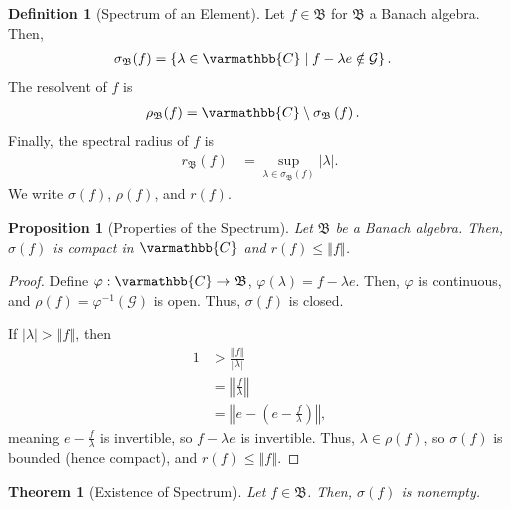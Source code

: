 \documentclass[12pt]{extarticle}
\newcommand{\C}{\mathbb{C}}
\newcommand{\norm}[1]{\left\Vert #1\right\Vert}
\newcommand{\set}[1]{\left\{#1\right\}}
\theoremstyle{plain}
\newtheorem*{theorem}{Theorem}
\newtheorem*{proposition}{Proposition}
\theoremstyle{definition}
\newtheorem*{definition}{Definition}
\theoremstyle{note}
\renewcommand*{\mathbb}[1]{\varmathbb{#1}}
\renewcommand{\newline}{\hfill\break}
\begin{document}
\begin{definition}[Spectrum of an Element]
  Let $f\in \mathfrak{B}$ for $\mathfrak{B}$ a Banach algebra. Then,
  \begin{align*}
    \sigma_{\mathfrak{B}}(f) &= \set{\lambda \in \C\mid f - \lambda e\notin \mathcal{G}}.
  \end{align*}
  The resolvent of $f$ is
  \begin{align*}
    \rho_{\mathfrak{B}}(f) &= \C \setminus \sigma_{\mathfrak{B}}\left(f\right).
  \end{align*}
  Finally, the spectral radius of $f$ is
  \begin{align*}
    r_{\mathfrak{B}}\left(f\right) &= \sup_{\lambda \in \sigma_{\mathfrak{B}}(f)}|\lambda|.
  \end{align*}
  We write $\sigma(f)$, $\rho(f)$, and $r(f)$.
\end{definition}
\begin{proposition}[Properties of the Spectrum]
  Let $\mathfrak{B}$ be a Banach algebra. Then, $\sigma(f)$ is compact in $\C$ and $r(f) \leq \norm{f}$.
\end{proposition}
\begin{proof}
  Define $\varphi: \C\rightarrow \mathfrak{B}$, $\varphi(\lambda) = f - \lambda e$. Then, $\varphi$ is continuous, and $\rho(f) = \varphi^{-1}\left(\mathcal{G}\right)$ is open. Thus, $\sigma(f)$ is closed.\newline

  If $|\lambda| > \norm{f}$, then
  \begin{align*}
    1 &> \frac{\norm{f}}{|\lambda|}\\
      &= \norm{\frac{f}{\lambda}}\\
      &= \norm{e - \left(e - \frac{f}{\lambda}\right)},
  \end{align*}
  meaning $e - \frac{f}{\lambda}$ is invertible, so $f - \lambda e$ is invertible. Thus, $\lambda \in \rho(f)$, so $\sigma(f)$ is bounded (hence compact), and $r(f) \leq \norm{f}$.
\end{proof}
\begin{theorem}[Existence of Spectrum]
  Let $f\in \mathfrak{B}$. Then, $\sigma(f)$ is nonempty.
\end{theorem}
\end{document}
